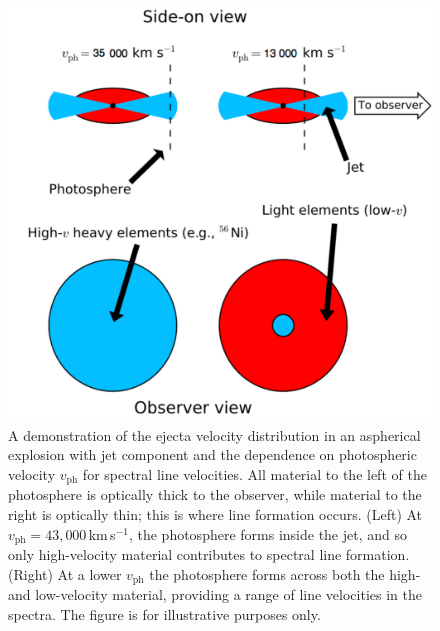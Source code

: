 \documentclass[fleqn,usenatbib]{mnras}
\begin{document}
\begin{figure}
\centering
\includegraphics[scale=0.3]{plots/view2.pdf}
\caption{A demonstration of the ejecta velocity distribution in an aspherical explosion with jet component and the dependence on photospheric velocity $v_\mathrm{ph}$ for spectral line velocities. All material to the left of the photosphere is optically thick to the observer, while material
to the right is optically thin; this is where line formation occurs.
(Left) At $v_\mathrm{ph} = 43,000$\,km\,s$^{-1}$, the photosphere forms inside the jet, and so only high-velocity material contributes to spectral line formation. (Right) At a lower $v_\mathrm{ph}$ the photosphere forms across both the high- and low-velocity material, providing a range of line velocities in the spectra. The figure is for illustrative purposes only. }
\label{fig:view}
\end{figure}
\end{document}
